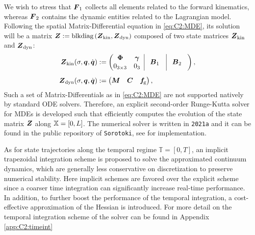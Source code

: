 %
%   
%
We wish to stress that $\boldsymbol{F}_1$ collects all elements related to the forward kinematics, whereas $\boldsymbol{F}_2$ contains the dynamic entities related to the Lagrangian model. Following the spatial Matrix-Differential equation in \eqref{eq:C2:MDE}, its solution will be a matrix $\boldsymbol{Z} := \text{blkdiag}\left( \boldsymbol{Z}_\textrm{kin}, \boldsymbol{Z}_\textrm{dyn} \right)$ composed of two state matrices $\boldsymbol{Z}_\textrm{kin}$ and $\boldsymbol{Z}_\textrm{dyn}$:
%
\begin{align}
\mat{Z}_\textrm{kin}(\sigma,\q,\dq) & := \begin{pmatrix}
\begin{matrix}
\PhiB  & \gammaB \\ 0_{3\times3} &  0_{3}
\end{matrix} \;\; \vrule & \!\mat{B}_1 & \vrule & \!\mat{B}_2 \;\;\;
 \end{pmatrix}, \\[0.5em]
\mat{Z}_\textrm{dyn}(\sigma,\q,\dq) & := \begin{pmatrix} \mat{M} & \mat{C} & \mat{f}\!\grav \end{pmatrix},
\end{align}
%
Such a set of Matrix-Differentials as in \eqref{eq:C2:MDE} are not supported natively by standard ODE solvers. Therefore, an explicit second-order Runge-Kutta solver for MDEs is developed such that efficiently computes the evolution of the state matrix $\boldsymbol{Z}$ along $\mathbb{X} = [0,L]$. The numerical solver is written in \matlab \texttt{2021a} and it can be found in the public repository of \texttt{Sorotoki}, see \cite{SorotokiCode} for implementation.

As for state trajectories along the temporal regime $\mathbb{T} = [0,T]$, an implicit trapezoidal integration scheme is proposed to solve the approximated continuum dynamics, which are generally less conservative on discretization to preserve numerical stability. Here implicit schemes are favored over the explicit scheme since a coarser time integration can significantly increase real-time performance. In addition, to further boost the performance of the temporal integration, a cost-effective approximation of the Hessian is introduced. For more detail on the temporal integration scheme of the solver can be found in Appendix \ref{app:C2:timeint}
